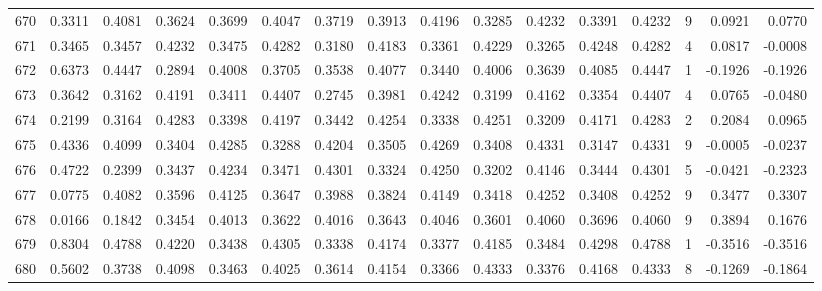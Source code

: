 \begin{tabular}{lrrrrrrrrrrrrrrr}
670 &      0.3311 &  0.4081 &  0.3624 &  0.3699 &  0.4047 &  0.3719 &  0.3913 &  0.4196 &  0.3285 &  0.4232 &   0.3391 &     0.4232 &      9 &                    0.0921 &                     0.0770 \\
671 &      0.3465 &  0.3457 &  0.4232 &  0.3475 &  0.4282 &  0.3180 &  0.4183 &  0.3361 &  0.4229 &  0.3265 &   0.4248 &     0.4282 &      4 &                    0.0817 &                    -0.0008 \\
672 &      0.6373 &  0.4447 &  0.2894 &  0.4008 &  0.3705 &  0.3538 &  0.4077 &  0.3440 &  0.4006 &  0.3639 &   0.4085 &     0.4447 &      1 &                   -0.1926 &                    -0.1926 \\
673 &      0.3642 &  0.3162 &  0.4191 &  0.3411 &  0.4407 &  0.2745 &  0.3981 &  0.4242 &  0.3199 &  0.4162 &   0.3354 &     0.4407 &      4 &                    0.0765 &                    -0.0480 \\
674 &      0.2199 &  0.3164 &  0.4283 &  0.3398 &  0.4197 &  0.3442 &  0.4254 &  0.3338 &  0.4251 &  0.3209 &   0.4171 &     0.4283 &      2 &                    0.2084 &                     0.0965 \\
675 &      0.4336 &  0.4099 &  0.3404 &  0.4285 &  0.3288 &  0.4204 &  0.3505 &  0.4269 &  0.3408 &  0.4331 &   0.3147 &     0.4331 &      9 &                   -0.0005 &                    -0.0237 \\
676 &      0.4722 &  0.2399 &  0.3437 &  0.4234 &  0.3471 &  0.4301 &  0.3324 &  0.4250 &  0.3202 &  0.4146 &   0.3444 &     0.4301 &      5 &                   -0.0421 &                    -0.2323 \\
677 &      0.0775 &  0.4082 &  0.3596 &  0.4125 &  0.3647 &  0.3988 &  0.3824 &  0.4149 &  0.3418 &  0.4252 &   0.3408 &     0.4252 &      9 &                    0.3477 &                     0.3307 \\
678 &      0.0166 &  0.1842 &  0.3454 &  0.4013 &  0.3622 &  0.4016 &  0.3643 &  0.4046 &  0.3601 &  0.4060 &   0.3696 &     0.4060 &      9 &                    0.3894 &                     0.1676 \\
679 &      0.8304 &  0.4788 &  0.4220 &  0.3438 &  0.4305 &  0.3338 &  0.4174 &  0.3377 &  0.4185 &  0.3484 &   0.4298 &     0.4788 &      1 &                   -0.3516 &                    -0.3516 \\
680 &      0.5602 &  0.3738 &  0.4098 &  0.3463 &  0.4025 &  0.3614 &  0.4154 &  0.3366 &  0.4333 &  0.3376 &   0.4168 &     0.4333 &      8 &                   -0.1269 &                    -0.1864 \\

\end{tabular}
